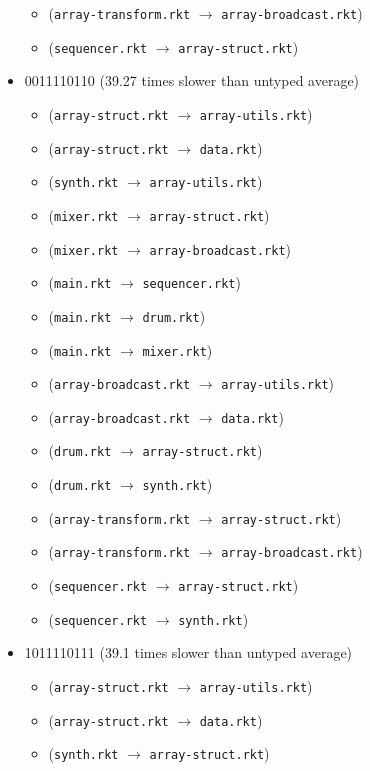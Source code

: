 \documentclass{article}
\newcommand{\mono}[1]{\texttt{#1}}
\begin{document}
\begin{itemize}
\begin{itemize}
  \item (\mono{array-transform.rkt} $\rightarrow$ \mono{array-broadcast.rkt})
  \item (\mono{sequencer.rkt} $\rightarrow$ \mono{array-struct.rkt})
  \end{itemize}
\item 0011110110 (39.27 times slower than untyped average)
  \begin{itemize}
  \item (\mono{array-struct.rkt} $\rightarrow$ \mono{array-utils.rkt})
  \item (\mono{array-struct.rkt} $\rightarrow$ \mono{data.rkt})
  \item (\mono{synth.rkt} $\rightarrow$ \mono{array-utils.rkt})
  \item (\mono{mixer.rkt} $\rightarrow$ \mono{array-struct.rkt})
  \item (\mono{mixer.rkt} $\rightarrow$ \mono{array-broadcast.rkt})
  \item (\mono{main.rkt} $\rightarrow$ \mono{sequencer.rkt})
  \item (\mono{main.rkt} $\rightarrow$ \mono{drum.rkt})
  \item (\mono{main.rkt} $\rightarrow$ \mono{mixer.rkt})
  \item (\mono{array-broadcast.rkt} $\rightarrow$ \mono{array-utils.rkt})
  \item (\mono{array-broadcast.rkt} $\rightarrow$ \mono{data.rkt})
  \item (\mono{drum.rkt} $\rightarrow$ \mono{array-struct.rkt})
  \item (\mono{drum.rkt} $\rightarrow$ \mono{synth.rkt})
  \item (\mono{array-transform.rkt} $\rightarrow$ \mono{array-struct.rkt})
  \item (\mono{array-transform.rkt} $\rightarrow$ \mono{array-broadcast.rkt})
  \item (\mono{sequencer.rkt} $\rightarrow$ \mono{array-struct.rkt})
  \item (\mono{sequencer.rkt} $\rightarrow$ \mono{synth.rkt})
  \end{itemize}
\item 1011110111 (39.1 times slower than untyped average)
  \begin{itemize}
  \item (\mono{array-struct.rkt} $\rightarrow$ \mono{array-utils.rkt})
  \item (\mono{array-struct.rkt} $\rightarrow$ \mono{data.rkt})
  \item (\mono{synth.rkt} $\rightarrow$ \mono{array-struct.rkt})

\end{itemize}
\end{itemize}
\end{document}
